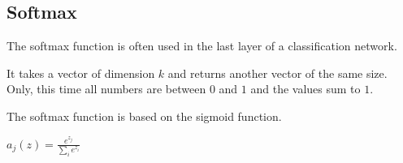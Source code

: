
\subsection{Softmax}

The softmax function is often used in the last layer of a classification network.

It takes a vector of dimension \(k\) and returns another vector of the same size. Only, this time all numbers are between \(0\) and \(1\) and the values sum to \(1\).

The softmax function is based on the sigmoid function.

\(a_j(z)=\frac{e^{z_j}}{\sum_{i}e^{z_i}}\)

